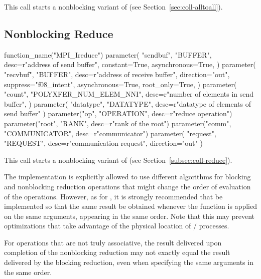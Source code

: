 This call starts a nonblocking variant of  (see
Section~\ref{sec:coll-alltoall}).

\subsection{Nonblocking Reduce}
\label{subsec:nbcoll-ireduce}

%
\begin{mpi-binding}
    function_name("MPI_Ireduce")
    parameter(
        "sendbuf",
        "BUFFER",
        desc=r"address of send buffer",
        constant=True,
        asynchronous=True,
    )
    parameter(
        "recvbuf",
        "BUFFER",
        desc=r"address of receive buffer",
        direction="out",
        suppress="f08_intent",
        asynchronous=True,
        root_only=True,
    )
    parameter(
        "count",
        "POLYXFER_NUM_ELEM_NNI",
        desc=r"number of elements in send buffer",
    )
    parameter(
        "datatype", "DATATYPE", desc=r"datatype of elements of send buffer"
    )
    parameter("op", "OPERATION", desc=r"reduce operation")
    parameter("root", "RANK", desc=r"rank of the root")
    parameter("comm", "COMMUNICATOR", desc=r"communicator")
    parameter(
        "request", "REQUEST", desc=r"communication request", direction="out"
    )
\end{mpi-binding}

This call starts a nonblocking variant of  (see
Section~\ref{subsec:coll-reduce}).


\begin{implementors}
The implementation is explicitly allowed to use different algorithms for
blocking and nonblocking reduction operations that might change the
order of evaluation of the operations. However, as for
, it is strongly recommended that
 be implemented so that the same result be
obtained whenever the function is applied on the same arguments,
appearing in the same order. Note that this may prevent optimizations
that take advantage of the physical location of \MPI/ processes.
\end{implementors}

\begin{users}
For operations that are not truly associative, the result delivered
upon completion of the nonblocking reduction may not exactly equal the
result delivered by the blocking reduction, even when specifying the
same arguments in the same order.
\end{users}



